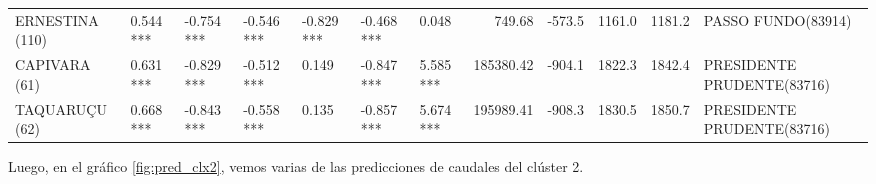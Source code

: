 \documentclass[12pt,oneside]{book}\usepackage[]{graphicx}\usepackage[]{color}
\newenvironment{knitrout}{}{} %
\theoremstyle{definition} %
\begin{document}
\begin{knitrout}
\begin{landscape}
\begin{table}
{\begin{tabular}[t]{lllllllrrrrl}
\addlinespace
\rowcolor{gray!6}  ERNESTINA (110) & 0.544 *** & -0.754 *** & -0.546 *** & -0.829 *** & -0.468 *** & 0.048 & 749.68 & -573.5 & 1161.0 & 1181.2 & PASSO FUNDO(83914)\\
CAPIVARA (61) & 0.631 *** & -0.829 *** & -0.512 *** & 0.149 & -0.847 *** & 5.585 *** & 185380.42 & -904.1 & 1822.3 & 1842.4 & PRESIDENTE PRUDENTE(83716)\\
\rowcolor{gray!6}  TAQUARUÇU (62) & 0.668 *** & -0.843 *** & -0.558 *** & 0.135 & -0.857 *** & 5.674 *** & 195989.41 & -908.3 & 1830.5 & 1850.7 & PRESIDENTE PRUDENTE(83716)\\
\bottomrule
\end{tabular}}
\end{table}
\end{landscape}


\end{knitrout}

Luego, en el gráfico \ref{fig:pred_clx2}, vemos varias de las predicciones de caudales del clúster 2.
\end{document}
